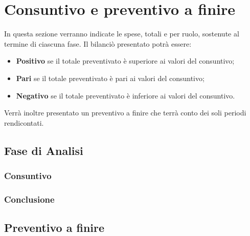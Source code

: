 \section{Consuntivo e preventivo a finire}
In questa sezione verranno indicate le spese, totali e per ruolo, sostenute al termine di ciascuna fase.
Il bilanciò presentato potrà essere:
\begin{itemize}
	\item \textbf{Positivo} se il totale preventivato è superiore ai valori del consuntivo;
	\item \textbf{Pari} se il totale preventivato è pari ai valori del consuntivo;
	\item \textbf{Negativo} se il totale preventivato è inferiore ai valori del consuntivo.
\end{itemize}
Verrà inoltre presentato un preventivo a finire che terrà conto dei soli periodi rendicontati.
\subsection{Fase di Analisi}
	\subsubsection{Consuntivo}
	\subsubsection{Conclusione}

\subsection{Preventivo a finire}